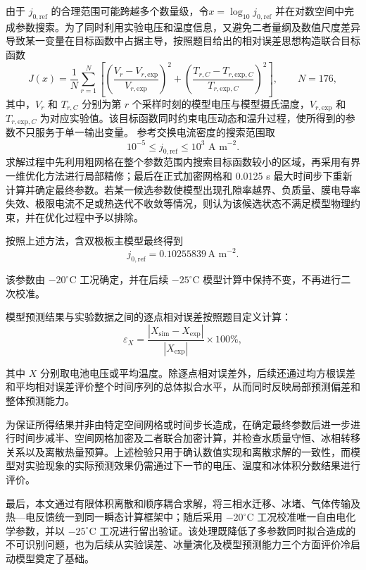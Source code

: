 \documentclass[bwprint]{gmcmthesis}
\numberwithin{figure}{section}
\begin{document}
由于 \(j_{0,\text{ref}}\) 的合理范围可能跨越多个数量级，令$x = \log_{10} j_{0,\text{ref}} $
并在对数空间中完成参数搜索。为了同时利用实验电压和温度信息，又避免二者量纲及数值尺度差异导致某一变量在目标函数中占据主导，按照题目给出的相对误差思想构造联合目标函数
\begin{equation}
J(x) = \frac{1}{N} \sum_{r=1}^N \left[ \left( \frac{V_r - V_{r,\text{exp}}}{V_{r,\text{exp}}} \right)^2 + \left( \frac{T_{r,C} - T_{r,\text{exp},C}}{T_{r,\text{exp},C}} \right)^2 \right], \qquad N = 176, \tag{4-95}
\end{equation}
其中，\(V_r\) 和 \(T_{r,C}\) 分别为第 \(r\) 个采样时刻的模型电压与模型摄氏温度，\(V_{r,\text{exp}}\) 和 \(T_{r,\text{exp},C}\) 为对应实验值。该目标函数同时约束电压动态和温升过程，使所得到的参数不只服务于单一输出变量。
参考交换电流密度的搜索范围取
\[
10^{-5} \leq j_{0,\text{ref}} \leq 10^3 \text{ A m}^{-2}.
\]
求解过程中先利用粗网格在整个参数范围内搜索目标函数较小的区域，再采用有界一维优化方法进行局部精修；最后在正式加密网格和 0.0125 s 最大时间步下重新计算并确定最终参数。若某一候选参数使模型出现孔隙率越界、负质量、膜电导率失效、极限电流不足或热迭代不收敛等情况，则认为该候选状态不满足模型物理约束，并在优化过程中予以排除。


\noindent 按照上述方法，含双极板主模型最终得到
\begin{equation}
j_{0,\text{ref}} = 0.10255839 \, \text{A m}^{-2}. \tag{4-96}
\end{equation}

\noindent 该参数由 \(-20^\circ\text{C}\) 工况确定，并在后续 \(-25^\circ\text{C}\) 模型计算中保持不变，不再进行二次校准。

\noindent 模型预测结果与实验数据之间的逐点相对误差按照题目定义计算：
\begin{equation}
\varepsilon_X = \frac{|X_{\text{sim}} - X_{\text{exp}}|}{|X_{\text{exp}}|} \times 100\%, \tag{4-97}
\end{equation}

\noindent 其中 \(X\) 分别取电池电压或平均温度。除逐点相对误差外，后续还通过均方根误差和平均相对误差评价整个时间序列的总体拟合水平，从而同时反映局部预测偏差和整体预测能力。


为保证所得结果并非由特定空间网格或时间步长造成，在确定最终参数后进一步进行时间步减半、空间网格加密及二者联合加密计算，并检查水质量守恒、冰相转移关系以及离散热量预算。上述检验只用于确认数值实现和离散求解的一致性，而模型对实验现象的实际预测效果仍需通过下一节的电压、温度和冰体积分数结果进行评价。

最后，本文通过有限体积离散和顺序耦合求解，将三相水迁移、冰堵、气体传输及热—电反馈统一到同一瞬态计算框架中；随后采用 \(-20^\circ\text{C}\) 工况校准唯一自由电化学参数，并以 \(-25^\circ\text{C}\) 工况进行留出验证。该处理既降低了多参数同时拟合造成的不可识别问题，也为后续从实验误差、冰量演化及模型预测能力三个方面评价冷启动模型奠定了基础。
\end{document}
